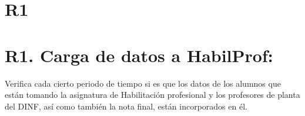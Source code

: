 

\section*{R1}

\newpage

\section*{R1. Carga de datos a HabilProf: }

Verifica cada cierto periodo de tiempo si es que los datos de los alumnos que están tomando la asignatura de Habilitación profesional y los profesores de planta del DINF, así como también la nota final, están incorporados en él.

\begin{itemize}
    \nombreAlumno{} %
    \rutAlumno{}
    \nombreProfesor{}
    \rutProfesor{}
    \notaFinal{}
    \fechaRegistroNota{}
    \reqObli{}
    \verDatos{}
    \verNotaFinal{}
\end{itemize}





